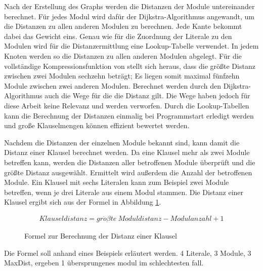 Nach der Erstellung des Graphs werden die Distanzen der Module untereinander berechnet. Für jedes Modul wird dafür der Dijkstra-Algorithmus \cite{dijkstra} angewandt,
um die Distanzen zu allen anderen Modulen zu berechnen. Jede Kante bekommt dabei das Gewicht eins. Genau wie für die Zuordnung der Literale zu den Modulen wird für
die Distanzermittlung eine Lookup-Tabelle verwendet. In jedem Knoten werden so die Distanzen zu allen anderen Modulen abgelegt. Für die vollständige Kompressionsfunktion
von  stellt sich heraus, dass die größte Distanz zwischen zwei Modulen sechzehn beträgt; Es liegen somit maximal fünfzehn Module zwischen zwei anderen
Modulen. Berechnet werden durch den Dijkstra-Algorithmus auch die Wege für die die Distanz gilt. Die Wege haben jedoch für diese Arbeit keine Relevanz und werden
verworfen. Durch die Lookup-Tabellen kann die Berechnung der Distanzen einmalig bei Programmstart erledigt werden und große Klauselmengen können effizient bewertet werden.

Nachdem die Distanzen der einzelnen Module bekannt sind, kann damit die Distanz einer Klausel berechnet werden. Da eine Klausel mehr als zwei Module betreffen kann, werden
die Distanzen aller betroffenen Module überprüft und die größte Distanz ausgewählt. Ermittelt wird außerdem die Anzahl der betroffenen Module. Ein Klausel mit sechs Literalen
kann zum Beispiel zwei Module betreffen, wenn je drei Literale aus einem Modul stammen. Die Distanz einer Klausel ergibt sich aus der Formel in Abbildung \ref{eq:clausedistance}.
\begin{figure}[!h]
  \begin{align*}
  Klauseldistanz = gr\ddot{o}{\beta}te~Moduldistanz - Modulanzahl + 1
  \end{align*}
  \caption{Formel zur Berechnung der Distanz einer Klausel}
  \label{eq:clausedistance}
\end{figure}

Die Formel soll anhand eines Beispiels erläutert werden. 4 Literale, 3 Module, 3 MaxDist, ergeben 1 übersprungenes modul im schlechtesten fall. 

